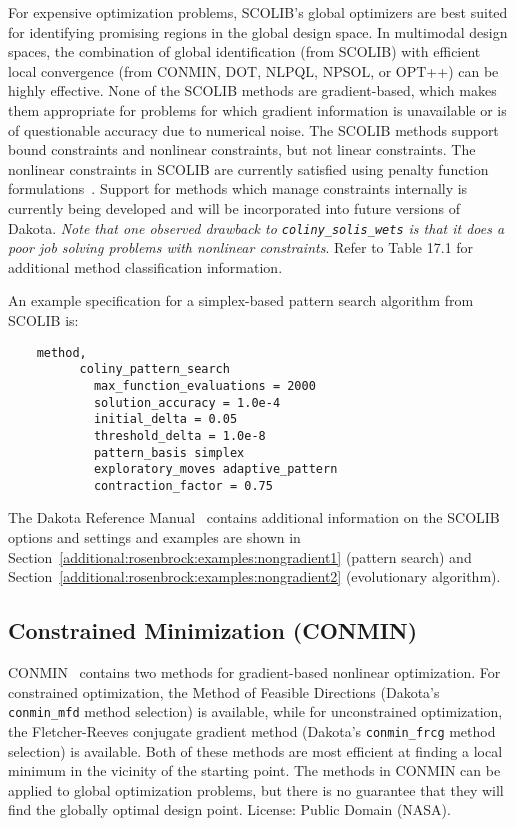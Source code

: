 For expensive optimization problems, SCOLIB's global optimizers are
best suited for identifying promising regions in the global design
space. In multimodal design spaces, the combination of global
identification (from SCOLIB) with efficient local convergence (from
CONMIN, DOT, NLPQL, NPSOL, or OPT++) can be highly effective. None of
the SCOLIB methods are gradient-based, which makes them appropriate
for problems for which gradient information is unavailable or is of
questionable accuracy due to numerical noise. The SCOLIB methods
support bound constraints and nonlinear constraints, but not linear
constraints.  The nonlinear constraints in SCOLIB are currently
satisfied using penalty function formulations~\cite{Pon96}. Support
for methods which manage constraints internally is currently being
developed and will be incorporated into future versions of Dakota.
\emph{Note that one observed drawback to \texttt{coliny\_solis\_wets}
is that it does a poor job solving problems with nonlinear
constraints}.  Refer to Table 17.1 for additional method
classification information.

An example specification for a simplex-based pattern search algorithm
from SCOLIB is:
\begin{small}
\begin{verbatim}
    method,
          coliny_pattern_search
            max_function_evaluations = 2000
            solution_accuracy = 1.0e-4
            initial_delta = 0.05
            threshold_delta = 1.0e-8
            pattern_basis simplex
            exploratory_moves adaptive_pattern
            contraction_factor = 0.75
\end{verbatim}
\end{small}

The Dakota Reference Manual~\cite{RefMan} contains additional information
on the SCOLIB options and settings and examples are shown in 
Section~\ref{additional:rosenbrock:examples:nongradient1} (pattern search) and
Section~\ref{additional:rosenbrock:examples:nongradient2} (evolutionary algorithm).

\subsection{Constrained Minimization (CONMIN)}\label{opt:software:conmin}

CONMIN~\cite{Van78} contains two methods for gradient-based nonlinear
optimization. For constrained optimization, the Method of Feasible
Directions (Dakota's \texttt{conmin\_mfd} method selection) is
available, while for unconstrained optimization, the Fletcher-Reeves
conjugate gradient method (Dakota's \texttt{conmin\_frcg} method
selection) is available. Both of these methods are most efficient at
finding a local minimum in the vicinity of the starting point. The
methods in CONMIN can be applied to global optimization problems, but
there is no guarantee that they will find the globally optimal design
point.  License: Public Domain (NASA).

